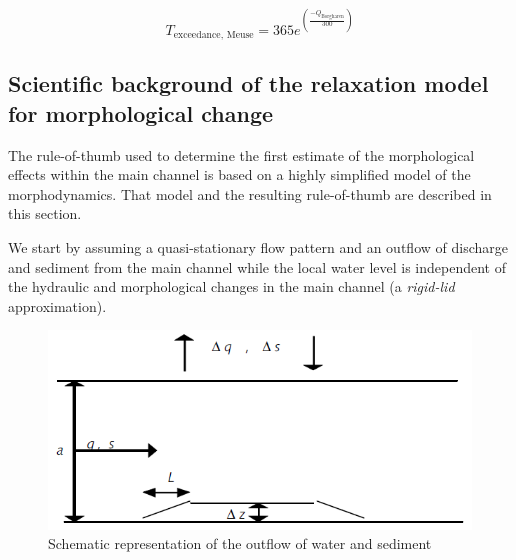 \begin{equation}
\label{Eq1b}
T_\text{exceedance, Meuse} = 365 e^{\left ( \frac{-  Q_\text{Borgharen}}{300} \right )}
\end{equation}

\subsection{Scientific background of the relaxation model for morphological change}

The rule-of-thumb used to determine the first estimate of the morphological effects within the main channel is based on a highly simplified model of the morphodynamics.
That model and the resulting rule-of-thumb are described in this section.

We start by assuming a quasi-stationary flow pattern and an outflow of discharge and sediment from the main channel while the local water level is independent of the hydraulic and morphological changes in the main channel (a \emph{rigid-lid} approximation).

\begin{figure}
\includegraphics[width=\columnwidth]{figures/Fig4.png}
\caption{Schematic representation of the outflow of water and sediment}
\label{App.Fig4}
\end{figure}

